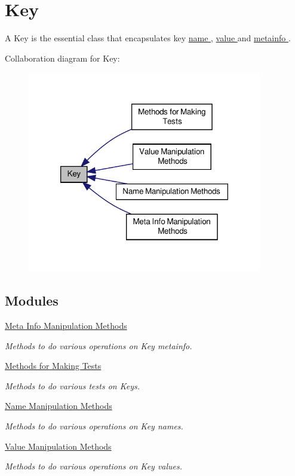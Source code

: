 \hypertarget{group__key}{\section{Key}
\label{group__key}
}


A Key is the essential class that encapsulates key \hyperlink{group__keyname}{name }, \hyperlink{group__keyvalue}{value } and \hyperlink{group__keymeta}{metainfo }.  


Collaboration diagram for Key\-:
\nopagebreak
\begin{figure}[H]
\begin{center}
\leavevmode
\includegraphics[width=290pt]{group__key}
\end{center}
\end{figure}
\subsection*{Modules}
\begin{DoxyCompactItemize}
\item 
\hyperlink{group__keymeta}{Meta Info Manipulation Methods}
\begin{DoxyCompactList}\small\item\em Methods to do various operations on Key metainfo. \end{DoxyCompactList}\item 
\hyperlink{group__keytest}{Methods for Making Tests}
\begin{DoxyCompactList}\small\item\em Methods to do various tests on Keys. \end{DoxyCompactList}\item 
\hyperlink{group__keyname}{Name Manipulation Methods}
\begin{DoxyCompactList}\small\item\em Methods to do various operations on Key names. \end{DoxyCompactList}\item 
\hyperlink{group__keyvalue}{Value Manipulation Methods}
\begin{DoxyCompactList}\small\item\em Methods to do various operations on Key values. \end{DoxyCompactList}\end{DoxyCompactItemize}
